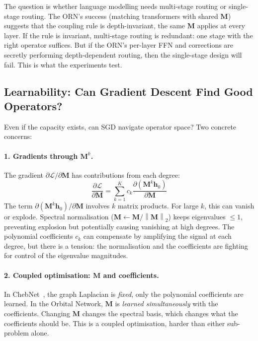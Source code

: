 \documentclass[11pt, a4paper]{article}
\newcommand{\M}{\mathbf{M}}
\newcommand{\h}{\mathbf{h}}
\newcommand{\norm}[1]{\left\| #1 \right\|}
\theoremstyle{plain}
\theoremstyle{definition}
\theoremstyle{remark}
\begin{document}
The question is whether language modelling needs multi-stage routing or single-stage routing.
The ORN's success (matching transformers with shared $\M$) suggests that the coupling rule is depth-invariant, the same $\M$ applies at every layer.
If the rule is invariant, multi-stage routing is redundant: one stage with the right operator suffices.
But if the ORN's per-layer FFN and corrections are secretly performing depth-dependent routing, then the single-stage design will fail.
This is what the experiments test.


\subsection{Learnability: Can Gradient Descent Find Good Operators?}

Even if the capacity exists, can SGD navigate operator space?
Two concrete concerns:

\paragraph{1. Gradients through $\M^k$.}
The gradient $\partial \mathcal{L}/\partial \M$ has contributions from each degree:
\begin{equation}
\frac{\partial \mathcal{L}}{\partial \M} = \sum_{k=1}^{K} c_k \frac{\partial (\M^k \h_0)}{\partial \M}
\end{equation}
The term $\partial(\M^k \h_0)/\partial \M$ involves $k$ matrix products.
For large $k$, this can vanish or explode.
Spectral normalisation ($\M \leftarrow \M / \norm{\M}_2$) keeps eigenvalues $\leq 1$, preventing explosion but potentially causing vanishing at high degrees.
The polynomial coefficients $c_k$ can compensate by amplifying the signal at each degree, but there is a tension: the normalisation and the coefficients are fighting for control of the eigenvalue magnitudes.

\paragraph{2. Coupled optimisation: $\M$ and coefficients.}
In ChebNet~\cite{defferrard2016chebnet}, the graph Laplacian is \emph{fixed}, only the polynomial coefficients are learned.
In the Orbital Network, $\M$ is \emph{learned simultaneously} with the coefficients.
Changing $\M$ changes the spectral basis, which changes what the coefficients should be.
This is a coupled optimisation, harder than either sub-problem alone.
\end{document}

